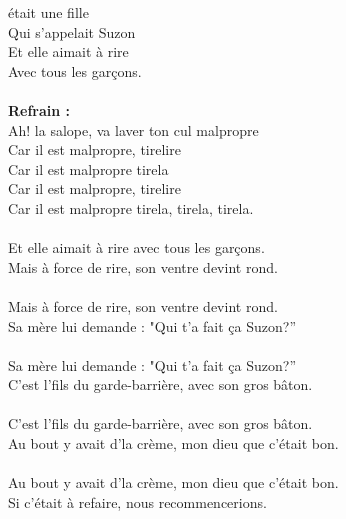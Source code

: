
 était une fille
\\Qui s'appelait Suzon
\\Et elle aimait à rire
\\Avec tous les garçons.
\\\\\textbf{Refrain :}
\\Ah! la salope, va laver ton cul malpropre
\\Car il est malpropre, tirelire
\\Car il est malpropre tirela
\\Car il est malpropre, tirelire
\\Car il est malpropre tirela, tirela, tirela.
\\\\Et elle aimait à rire avec tous les garçons.
\\Mais à force de rire, son ventre devint rond.
\\\\Mais à force de rire, son ventre devint rond.
\\Sa mère lui demande : "Qui t'a fait ça Suzon?”
\\\\Sa mère lui demande : "Qui t'a fait ça Suzon?”
\\C'est l'fils du garde-barrière, avec son gros bâton.
\\\\C'est l'fils du garde-barrière, avec son gros bâton.
\\Au bout y avait d'la crème, mon dieu que c'était bon.
\\\\Au bout y avait d'la crème, mon dieu que c'était bon.
\\Si c'était à refaire, nous recommencerions.

\breakpage